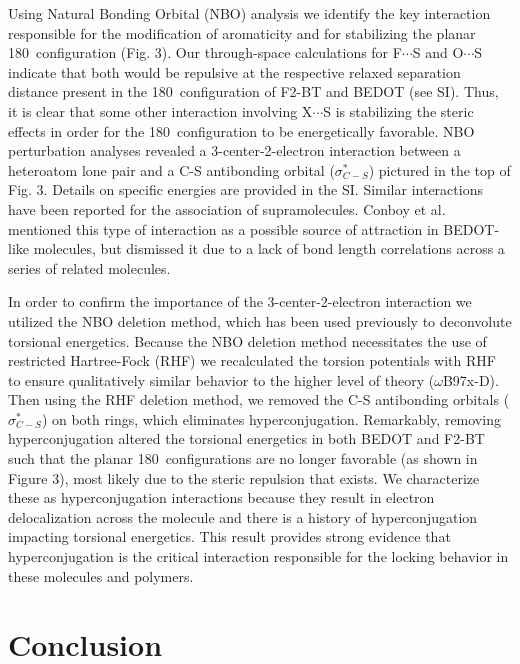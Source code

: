 Using Natural Bonding Orbital (NBO) analysis we identify the key interaction responsible for the modification of aromaticity and for stabilizing the planar 180\textdegree \ configuration (Fig. 3). Our through-space calculations for F$\cdots$S and O$\cdots$S indicate that both would be repulsive at the respective relaxed separation distance present in the 180\textdegree \ configuration of F2-BT and BEDOT (see SI). Thus, it is clear that some other interaction involving X$\cdots$S is stabilizing the steric effects in order for the 180\textdegree \ configuration to be energetically favorable. NBO perturbation analyses revealed a 3-center-2-electron interaction between a heteroatom lone pair and a C-S antibonding orbital ($\sigma^{*}_{C-S}$) pictured in the top of Fig. 3. Details on specific energies are provided in the SI. Similar interactions have been reported for the association of supramolecules.\cite{Cozzolino2005} Conboy et al. mentioned this type of interaction as a possible source of attraction in BEDOT-like molecules, but dismissed it due to a lack of bond length correlations across a series of related molecules.\cite{Conboy2016}

In order to confirm the importance of the 3-center-2-electron interaction we utilized the NBO deletion method\cite{NBO6}, which has been used previously to deconvolute torsional energetics.\cite{Pophristic2001} Because the NBO deletion method necessitates the use of restricted Hartree-Fock (RHF) we recalculated the torsion potentials with RHF to ensure qualitatively similar behavior to the higher level of theory ($\omega$B97x-D). Then using the RHF deletion method, we removed the C-S antibonding orbitals ($\sigma^{*}_{C-S}$) on both rings, which eliminates hyperconjugation. Remarkably, removing hyperconjugation altered the torsional energetics in both BEDOT and F2-BT such that the planar 180\textdegree \ configurations are no longer favorable (as shown in Figure 3), most likely due to the steric repulsion that exists. We characterize these as hyperconjugation interactions because they result in electron delocalization across the molecule and there is a history of hyperconjugation impacting torsional energetics.\cite{Pophristic2001, R.Rablen1999} This result provides strong evidence that hyperconjugation is the critical interaction responsible for the locking behavior in these molecules and polymers.

\section{Conclusion}

